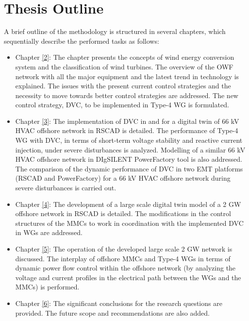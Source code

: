 \section{Thesis Outline}
A brief outline of the methodology is structured in several chapters, which sequentially describe the performed tasks as follows:
\begin{itemize}
    \item Chapter \ref{2}: The chapter presents the concepts of wind energy conversion system and the classification of wind turbines. The overview of the \gls{OWF} network with all the major equipment and the latest trend in technology is explained. The issues with the present current control strategies and the necessity to move towards better control strategies are addressed. The new control strategy, \gls{DVC}, to be implemented in Type-4 \gls{WG} is formulated.  
    
    \item Chapter \ref{3}: The implementation of \gls{DVC} in \cite{korai_dynamic_2019} and \cite{sethi_real-time_nodate-new} for a digital twin of 66 kV \gls{HVAC} offshore network in RSCAD is detailed. The performance of Type-4 \gls{WG} with \gls{DVC}, in terms of short-term voltage stability and reactive current injection, under severe disturbances is analyzed. Modelling of a similar 66 kV \gls{HVAC} offshore network in DIgSILENT PowerFactory tool is also addressed. The comparison of the dynamic performance of \gls{DVC} in two \gls{EMT} platforms (RSCAD and PowerFactory) for a 66 kV \gls{HVAC} offshore network during severe disturbances is carried out. 
    
    \item Chapter \ref{4}: The development of a large scale digital twin model of a 2 GW offshore network in RSCAD is detailed. The modifications in the control structures of the \gls{MMC}s to work in coordination with the implemented \gls{DVC} in \gls{WG}s are addressed.
    
    \item Chapter \ref{5}: The operation of the developed large scale 2 GW network is discussed. The interplay of offshore \gls{MMC}s and Type-4 \gls{WG}s in terms of dynamic power flow control within the offshore network (by analyzing the voltage and current profiles in the electrical path between the \gls{WG}s and the \gls{MMC}s) is performed. 
    
    \item Chapter \ref{6}: The significant conclusions for the research questions are provided. The future scope and recommendations are also added.
\end{itemize}

